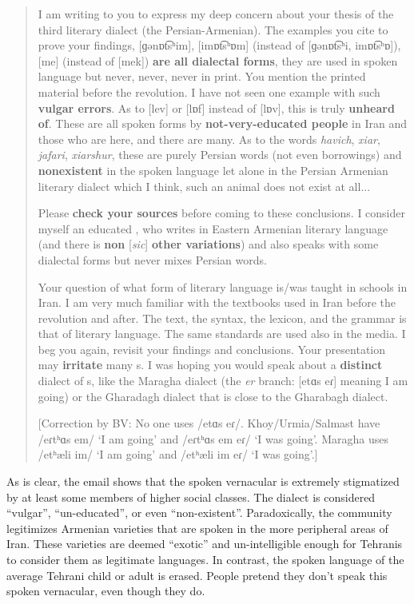 \begin{quote}
	\begin{sloppypar}
	I am writing to you to express my deep concern about your thesis of the third  literary dialect (the Persian-Armenian). The examples you cite to prove your  findings, [ɡənɒt͡sʰim], [imɒt͡sʰɒm] (instead of [ɡənɒt͡sʰi, imɒt͡sʰɒ]), [me]      (instead of [mek]) \textbf{are all dialectal forms}, they are used in spoken language but  never, never, never in print. You mention the printed material before the  revolution. I have not seen one example with such \textbf{vulgar errors}. As to [lev] or [lɒf]  instead of [lɒv], this is truly \textbf{unheard of}. These are all spoken forms by  \textbf{not-very-educated people} in Iran and those who are here, and there are many. As to the  words \textit{havich}, \textit{xiar}, \textit{jafari}, \textit{xiarshur}, these are purely Persian words (not even  borrowings) and \textbf{nonexistent} in the spoken language let alone in the Persian  Armenian literary dialect which I think, such an animal does not exist at all... 
	\end{sloppypar}
	
	Please \textbf{check your sources} before coming to these conclusions. I  consider myself an educated {\iaIA}, who writes in Eastern Armenian  literary language (and there is \textbf{non} [\textit{sic}] \textbf{other variations}) and also speaks with some  dialectal forms but never mixes Persian words.  
	
	
	Your question of what form of literary language is/was taught in schools in  Iran. I am very much familiar with the textbooks used in Iran before the  revolution and after. The text, the syntax, the lexicon, and the grammar is that of  {\seaSEA} literary language. The same standards are used also  in the media. I beg you again, revisit your findings and conclusions. Your  presentation may \textbf{irritate} many {\iaIA}s. I was hoping you would speak  about a \textbf{distinct} dialect of {\iaIA}s, like the Maragha dialect (the \textit{er}  branch: [etɑs eɾ] meaning I am going) or the Gharadagh dialect that is close  to the Gharabagh dialect.
	
	[Correction by BV: No one uses /etɑs eɾ/. Khoy/Urmia/Salmast have /eɾtʰɑs em/ `I am going' and /eɾtʰɑs em eɾ/  `I was going'. Maragha uses /etʰæli im/ `I am going' and /etʰæli im eɾ/ `I was going'.]
\end{quote}


As is clear, the email shows that the spoken vernacular is extremely stigmatized by at least some members of higher social classes. The dialect is considered ``vulgar'', ``un-educated'', or even ``non-existent''. Paradoxically, the {\iaIA} community legitimizes Armenian varieties that are spoken in the more peripheral   areas of Iran. These varieties are deemed ``exotic'' and un-intelligible enough for Tehranis to consider them as legitimate languages. In contrast, the spoken language of the average Tehrani child or adult is erased. People pretend they don't speak this spoken vernacular, even though they do. 






